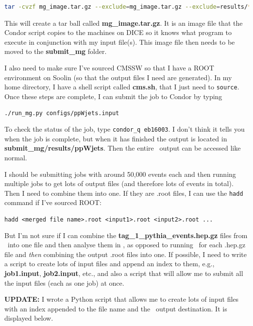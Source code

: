 \begin{lstlisting}[belowskip=-0.7cm, language=sh, numbers=none]
tar -cvzf mg_image.tar.gz --exclude=mg_image.tar.gz --exclude=results/* *
\end{lstlisting}

This will create a tar ball called \textbf{mg\_image.tar.gz}. It is an image file that the Condor script copies to the machines on DICE so it knows what program to execute in conjunction with my input file(s). This image file then needs to be moved to the \textbf{submit\_mg} folder.

I also need to make sure I've sourced CMSSW so that I have a ROOT environment on Soolin (so that the output files I need are generated). In my home directory, I have a shell script called \textbf{cms.sh}, that I just need to \verb!source!. Once these steps are complete, I can submit the job to Condor by typing

\verb!./run_mg.py configs/ppWjets.input!

To check the status of the job, type \verb!condor_q eb16003!. I don't think it tells you when the job is complete, but when it has finished the output is located in \textbf{submit\_mg/results/ppWjets}. Then the entire \madgraph\ output can be accessed like normal.

I should be submitting jobs with around 50,000 events each and then running multiple jobs to get lots of output files (and therefore lots of events in total). Then I need to combine them into one. If they are .root files, I can use the \verb!hadd! command if I've sourced ROOT:

\verb!hadd <merged file name>.root <input1>.root <input2>.root ...!

But I'm not sure if I can combine the \textbf{tag\_1\_pythia\_events.hep.gz} files from \madgraph\ into one file and then analyse them in \madanalysis, as opposed to running \madanalysis\ for each .hep.gz file and \emph{then} combining the output .root files into one. If possible, I need to write a script to create lots of input files and append an index to them, e.g., \textbf{job1.input}, \textbf{job2.input}, etc., and also a script that will allow me to submit all the input files (each as one job) at once.

\textbf{UPDATE:} I wrote a Python script that allows me to create lots of input files with an index appended to the file name and the \madgraph\ output destination. It is displayed below.

 

